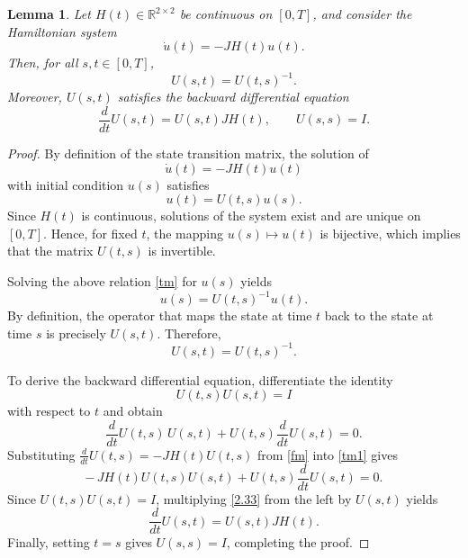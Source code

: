 \documentclass[reqno]{amsart}
\numberwithin{equation}{section}
\newtheorem{lemma}[theorem]{Lemma}
\begin{document}
 \begin{lemma} Let $H(t)\in\mathbb{R}^{2\times 2}$ be continuous on $[0,T]$, and consider the Hamiltonian system
\begin{equation}
\dot u(t)=-JH(t)u(t).
\end{equation}
Then, for all $s,t\in[0,T]$,
\begin{equation}
U(s,t)=U(t,s)^{-1}.
\end{equation}
Moreover, $U(s,t)$ satisfies the backward differential equation
\begin{equation}
\frac{d}{dt}U(s,t)=U(s,t)JH(t), \qquad U(s,s)=I.
\end{equation}
\end{lemma}

\begin{proof}
By definition of the state transition matrix, the solution of
\begin{equation}
\dot u(t)=-JH(t)u(t)
\end{equation}
with initial condition $u(s)$ satisfies
\begin{equation} \label{tm}
u(t)=U(t,s)u(s).
\end{equation}
Since $H(t)$ is continuous, solutions of the system exist and are unique on $[0,T]$. Hence, for fixed $t$, the mapping $u(s)\mapsto u(t)$ is bijective, which implies that the matrix $U(t,s)$ is invertible.

Solving the above relation \eqref{tm} for $u(s)$ yields
\[
u(s)=U(t,s)^{-1}u(t).
\]
By definition, the operator that maps the state at time $t$ back to the state at time $s$ is precisely $U(s,t)$. Therefore,
\[
U(s,t)=U(t,s)^{-1}.
\]

To derive the backward differential equation, differentiate the identity
\[
U(t,s)U(s,t)=I
\]
with respect to $t$ and obtain
\begin{equation} \label{tm1}
\frac{d}{dt}U(t,s)\,U(s,t)+U(t,s)\frac{d}{dt}U(s,t)=0.
\end{equation}
Substituting $\frac{d}{dt}U(t,s)=-JH(t)U(t,s)$ from \eqref{fm} into \eqref{tm1} gives
\begin{equation}\label{2.33}
-\,JH(t)U(t,s)U(s,t)+U(t,s)\frac{d}{dt}U(s,t)=0.
\end{equation}
Since $U(t,s)U(s,t)=I$, multiplying \eqref{2.33} from the left by $U(s,t)$ yields
\begin{equation}\label{dst}
\frac{d}{dt}U(s,t)=U(s,t)JH(t).
\end{equation}
Finally, setting $t=s$ gives $U(s,s)=I$, completing the proof.
\end{proof}
\end{document}
